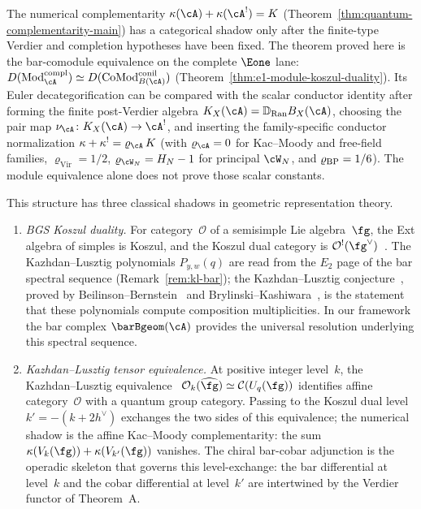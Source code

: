 \begin{remark}
\label{rem:categorified-koszul-kl-bfm}
\ClaimStatusHeuristic
{}
The numerical complementarity $\kappa(\cA) + \kappa(\cA^!) = K$
(Theorem~\ref{thm:quantum-complementarity-main}) has a categorical
shadow only after the finite-type Verdier and completion hypotheses
have been fixed. The theorem proved here is the bar-comodule
equivalence on the complete $\Eone$ lane:
$D(\mathrm{Mod}_{\cA}^{\mathrm{compl}}) \simeq
D(\mathrm{CoMod}_{B(\cA)}^{\mathrm{conil}})$
(Theorem~\ref{thm:e1-module-koszul-duality}). Its Euler
decategorification can be compared with the scalar conductor identity
after forming the finite post-Verdier algebra
$K_X(\cA)=\mathbb D_{\operatorname{Ran}}B_X(\cA)$, choosing the pair
map $\nu_\cA\colon K_X(\cA)\to\cA^!$, and inserting the family-specific conductor
normalization
$\kappa + \kappa^! = \varrho_{\cA}\,K$
(with $\varrho_{\cA} = 0$ for Kac--Moody and free-field families,
$\varrho_{\mathrm{Vir}} = 1/2$, $\varrho_{\cW_N} = H_N - 1$ for principal
$\cW_N$, and $\varrho_{\mathrm{BP}} = 1/6$). The module equivalence alone does
not prove those scalar constants.

This structure has three classical shadows in geometric
representation theory.

\begin{enumerate}[label=\textup{(\roman*)}]
\item \emph{BGS Koszul duality.}
 For category~$\mathcal{O}$ of a semisimple Lie algebra~$\fg$,
 the Ext algebra of simples is Koszul, and the
 Koszul dual category is
 $\mathcal{O}^!(\fg^\vee)$~\cite{BGS96}. The
 Kazhdan--Lusztig polynomials $P_{y,w}(q)$ are read from the
 $E_2$ page of the bar spectral sequence
 (Remark~\ref{rem:kl-bar}); the Kazhdan--Lusztig
 conjecture~\cite{KL79}, proved by
 Beilinson--Bernstein~\cite{BB81} and
 Brylinski--Kashiwara~\cite{BK81}, is the statement that
 these polynomials compute composition multiplicities. In our
 framework the bar complex $\barBgeom(\cA)$ provides the
 universal resolution underlying this spectral sequence.

\item \emph{Kazhdan--Lusztig tensor equivalence.}
 At positive integer level~$k$, the
 Kazhdan--Lusztig equivalence~\cite{KL93}
 $\mathcal{O}_k(\widehat{\fg}) \simeq
 \mathcal{C}(U_q(\fg))$ identifies affine category~$\mathcal{O}$
 with a quantum group category. Passing to the Koszul dual
 level $k' = -(k + 2h^\vee)$ exchanges the two sides of
	 this equivalence; the numerical shadow is the affine Kac--Moody
	 complementarity: the sum
	 $\kappa(V_k(\fg)) + \kappa(V_{k'}(\fg))$ vanishes.
 The chiral bar-cobar adjunction is the operadic skeleton
 that governs this level-exchange: the bar differential at
 level~$k$ and the cobar differential at level~$k'$ are
 intertwined by the Verdier functor of Theorem~A.


\end{enumerate}
\end{remark}
